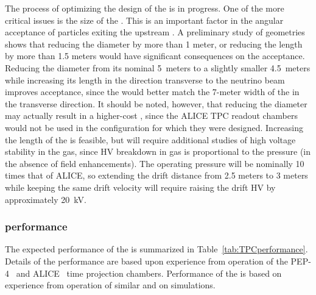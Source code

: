  The process of optimizing the design of the  is in progress. One of the more critical issues is the size of the .  This is an important factor in the angular acceptance of particles exiting the upstream . A preliminary study of geometries shows that reducing the  diameter by more than 1 meter, or reducing the length by more than 1.5 meters would have significant consequences on the acceptance. Reducing the  diameter from its nominal 5~meters to a slightly smaller 4.5~meters while increasing its length in the direction transverse to the neutrino beam improves acceptance, since the  would better match the 7-meter width of the  in the transverse direction. It should be noted, however, that reducing the diameter may actually result in a higher-cost , since the ALICE TPC readout chambers would not be used in the configuration for which they were designed. Increasing the length of the  is feasible, but will require additional studies of high voltage stability in the gas, since HV breakdown in gas is proportional to the pressure (in the absence of field enhancements).  The  operating pressure will be nominally 10 times that of ALICE, so extending the drift distance from 2.5 meters to 3 meters while keeping the same drift velocity will require raising the drift HV by approximately 20~kV.



\subsubsection{ performance}
The expected performance of the  is summarized in Table~\ref{tab:TPCperformance}. Details of the  performance are based upon experience from operation of the PEP-4~\cite{PEP4_results_Layter,PEP4_Stork,Madaras:1982cj} and ALICE~\cite{Alessandro:2006yt} time projection chambers. Performance of the  is based on experience from operation of similar  and on simulations. 

